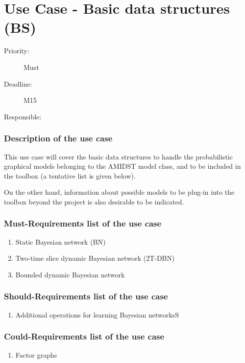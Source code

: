 \newpage
\section{Use Case - Basic data structures (BS)}
\label{UseCase:BS}

\begin{description}
\item[Priority:] Must
\item[Deadline:] M15
\item[Responsible:] 
\end{description}

\subsubsection*{Description of the use case}

This use case will cover the basic data structures to handle the probabilistic graphical models belonging to the AMIDST model class, and to be included in the toolbox (a tentative list is given below).

On the other hand, information about possible models to be plug-in into the toolbox beyond the project is also desirable to be indicated.  

\subsubsection*{Must-Requirements list of the use case}

\begin{enumerate}
\item Static Bayesian network (BN)
\item Two-time slice dynamic Bayesian network (2T-DBN)
\item Bounded dynamic Bayesian network 
\end{enumerate}

\subsubsection*{Should-Requirements list of the use case}

\begin{enumerate}
\item Additional operations for learning Bayesian networksS
\end{enumerate}

\subsubsection*{Could-Requirements list of the use case}

\begin{enumerate}
\item Factor graphs
\end{enumerate}